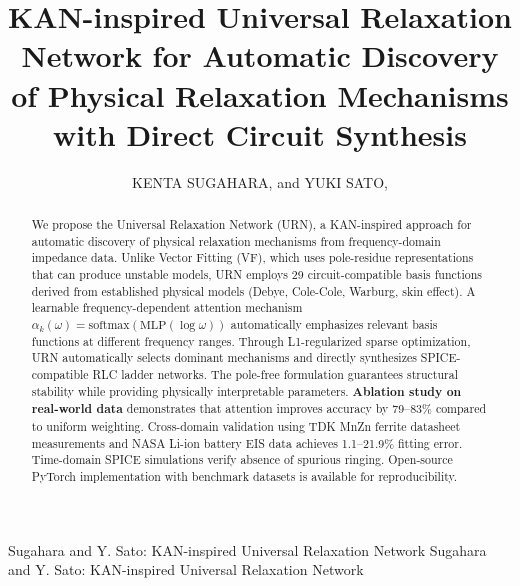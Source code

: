 \documentclass{ieeeaccess}
\begin{document}

\title{KAN-inspired Universal Relaxation Network for Automatic Discovery of Physical Relaxation Mechanisms with Direct Circuit Synthesis}

\author{
\uppercase{Kenta Sugahara}, and
\uppercase{Yuki Sato},
}

\address[1]{Faculty of Science and Engineering, Kindai University, Higashi-Osaka 577-8502, Japan}
\address[2]{Department of Electrical and Electronic Engineering, Aoyama Gakuin University, Sagamihara 252-5258, Japan}


\markboth
{Sugahara and Y. Sato: KAN-inspired Universal Relaxation Network}
{Sugahara and Y. Sato: KAN-inspired Universal Relaxation Network}


\begin{abstract}
We propose the Universal Relaxation Network (URN), a KAN-inspired approach for automatic discovery of physical relaxation mechanisms from frequency-domain impedance data. Unlike Vector Fitting (VF), which uses pole-residue representations that can produce unstable models, URN employs 29 circuit-compatible basis functions derived from established physical models (Debye, Cole-Cole, Warburg, skin effect). A learnable frequency-dependent attention mechanism $\alpha_k(\omega) = \text{softmax}(\text{MLP}(\log\omega))$ automatically emphasizes relevant basis functions at different frequency ranges. Through L1-regularized sparse optimization, URN automatically selects dominant mechanisms and directly synthesizes SPICE-compatible RLC ladder networks. The pole-free formulation guarantees structural stability while providing physically interpretable parameters. \textbf{Ablation study on real-world data} demonstrates that attention improves accuracy by 79--83\% compared to uniform weighting. Cross-domain validation using TDK MnZn ferrite datasheet measurements and NASA Li-ion battery EIS data achieves 1.1--21.9\% fitting error. Time-domain SPICE simulations verify absence of spurious ringing. Open-source PyTorch implementation with benchmark datasets is available for reproducibility.
\end{abstract}
\end{document}
